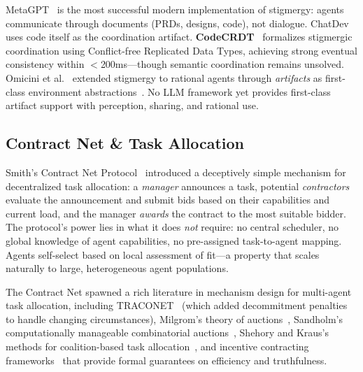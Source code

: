 \documentclass{article}
\begin{document}
MetaGPT~\citep{hong2024metagpt} is the most successful modern implementation of
stigmergy: agents communicate through documents (PRDs, designs, code), not dialogue.
ChatDev~\citep{qian2024chatdev} uses code itself as the coordination artifact.
\textbf{CodeCRDT}~\citep{codecrdt2025} formalizes stigmergic coordination using
Conflict-free Replicated Data Types, achieving strong eventual consistency within
$<$200ms---though semantic coordination remains unsolved.
Omicini et al.~\citep{omicini2004cognitive} extended stigmergy to rational agents
through \emph{artifacts} as first-class environment abstractions~\citep{sutra624_environments2005}.
No LLM framework yet provides first-class artifact support with
perception, sharing, and rational use.

\subsection{Contract Net \& Task Allocation}
\label{sec:p-contract}

%
%
%
%
%

Smith's Contract Net Protocol~\citep{smith1980contract} introduced a deceptively simple
mechanism for decentralized task allocation: a \emph{manager} announces a task, potential
\emph{contractors} evaluate the announcement and submit bids based on their capabilities
and current load, and the manager \emph{awards} the contract to the most suitable bidder.
The protocol's power lies in what it does \emph{not} require: no central scheduler, no
global knowledge of agent capabilities, no pre-assigned task-to-agent mapping. Agents
self-select based on local assessment of fit---a property that scales naturally to large,
heterogeneous agent populations.

The Contract Net spawned a rich literature in mechanism design for multi-agent task
allocation, including TRACONET~\citep{sandholm1995traconet} (which added decommitment
penalties to handle changing circumstances), Milgrom's theory of
auctions~\citep{sutra14938_theory1982}, Sandholm's computationally manageable
combinatorial auctions~\citep{sutra19364_computationally1998}, Shehory and Kraus's
methods for coalition-based task allocation~\citep{sutra92_methods1998}, and
incentive contracting frameworks~\citep{sutra13562_overview1996} that provide formal
guarantees on efficiency and truthfulness.
\end{document}
